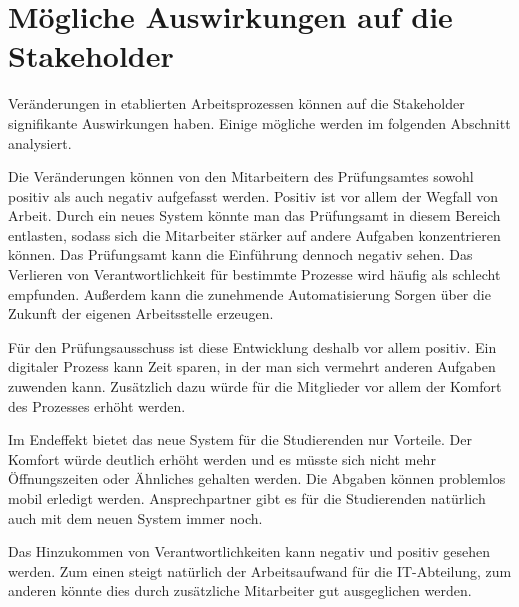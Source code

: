 \section{Mögliche Auswirkungen auf die Stakeholder}

Veränderungen in etablierten Arbeitsprozessen können auf die Stakeholder signifikante Auswirkungen haben. Einige mögliche werden im folgenden Abschnitt analysiert.

Die Veränderungen können von den Mitarbeitern des Prüfungsamtes sowohl positiv als auch negativ aufgefasst werden. Positiv ist vor allem der Wegfall von Arbeit. Durch ein neues System könnte man das Prüfungsamt in diesem Bereich entlasten, sodass sich die Mitarbeiter stärker auf andere Aufgaben konzentrieren können. Das Prüfungsamt kann die Einführung dennoch negativ sehen. Das Verlieren von Verantwortlichkeit für bestimmte Prozesse wird häufig als schlecht empfunden. Außerdem kann die zunehmende Automatisierung Sorgen über die Zukunft der eigenen Arbeitsstelle erzeugen.

Für den Prüfungsausschuss ist diese Entwicklung deshalb vor allem positiv. Ein digitaler Prozess kann Zeit sparen, in der man sich vermehrt anderen Aufgaben zuwenden kann. Zusätzlich dazu würde für die Mitglieder vor allem der Komfort des Prozesses erhöht werden.

Im Endeffekt bietet das neue System für die Studierenden nur Vorteile. Der Komfort würde deutlich erhöht werden und es müsste sich nicht mehr Öffnungszeiten oder Ähnliches gehalten werden. Die Abgaben können problemlos mobil erledigt werden. Ansprechpartner gibt es für die Studierenden natürlich auch mit dem neuen System immer noch.

Das Hinzukommen von Verantwortlichkeiten kann negativ und positiv gesehen werden. Zum einen steigt natürlich der Arbeitsaufwand für die IT-Abteilung, zum anderen könnte dies durch zusätzliche Mitarbeiter gut ausgeglichen werden.
